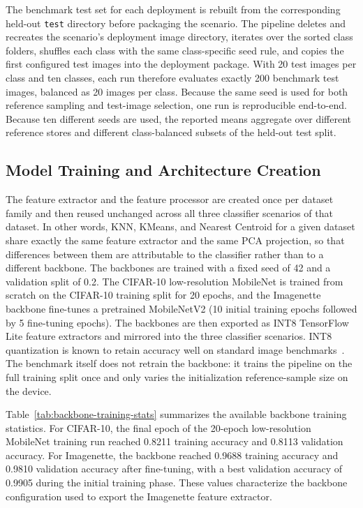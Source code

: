 \documentclass[sigconf,review,nonacm]{acmart}
\begin{document}
The benchmark test set for each deployment is rebuilt from the corresponding held-out \texttt{test} directory before packaging the scenario.
The pipeline deletes and recreates the scenario's deployment image directory, iterates over the sorted class folders, shuffles each class with the same class-specific seed rule, and copies the first configured test images into the deployment package.
With 20 test images per class and ten classes, each run therefore evaluates exactly 200 benchmark test images, balanced as 20 images per class.
Because the same seed is used for both reference sampling and test-image selection, one run is reproducible end-to-end. Because ten different seeds are used, the reported means aggregate over different reference stores and different class-balanced subsets of the held-out test split.

\subsection{Model Training and Architecture Creation}
\label{sec:training}
The feature extractor and the feature processor are created once per dataset family and then reused unchanged across all three classifier scenarios of that dataset.
In other words, KNN, KMeans, and Nearest Centroid for a given dataset share exactly the same feature extractor and the same PCA projection, so that differences between them are attributable to the classifier rather than to a different backbone.
The backbones are trained with a fixed seed of 42 and a validation split of 0.2.
The CIFAR-10 low-resolution MobileNet is trained from scratch on the CIFAR-10 training split for 20 epochs, and the Imagenette backbone fine-tunes a pretrained MobileNetV2 (10 initial training epochs followed by 5 fine-tuning epochs).
The backbones are then exported as INT8 TensorFlow Lite feature extractors and mirrored into the three classifier scenarios. INT8 quantization is known to retain accuracy well on standard image benchmarks~\cite{shabir2025compression,ravaglia2021tinyml}.
The benchmark itself does not retrain the backbone: it trains the pipeline on the full training split once and only varies the initialization reference-sample size on the device.

Table~\ref{tab:backbone-training-stats} summarizes the available backbone training statistics.
For CIFAR-10, the final epoch of the 20-epoch low-resolution MobileNet training run reached 0.8211 training accuracy and 0.8113 validation accuracy.
For Imagenette, the backbone reached 0.9688 training accuracy and 0.9810 validation accuracy after fine-tuning, with a best validation accuracy of 0.9905 during the initial training phase.
These values characterize the backbone configuration used to export the Imagenette feature extractor.
\end{document}
